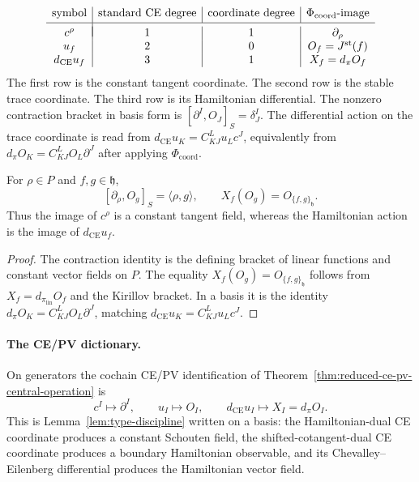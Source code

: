 \documentclass[11pt]{memoir}
\begin{document}
\begin{rmk}\label{rmk:type-discipline-table}
  \[
    \begin{array}{c|c|c|c}
      \text{symbol} & \text{standard CE degree}
        & \text{coordinate degree} & \Phi_{\mathrm{coord}}\text{-image}
        \\[2pt]
      \hline\\[-9pt]
      c^\rho & 1 & 1
        & \partial_\rho
        \\
      u_f & 2 & 0
        & O_f=J^{\mathrm{st}}(f)
        \\
      d_{\mathrm{CE}}u_f & 3 & 1
        & X_f=d_\pi O_f
    \end{array}
  \]
  The first row is the constant tangent coordinate.  The second row is
  the stable trace coordinate.  The third row is its Hamiltonian
  differential.  The
  nonzero contraction bracket in basis form is
  \([\partial^I,O_J]_S=\delta^I_J\).  The differential action on the trace
  coordinate is read from
  \(d_{\mathrm{CE}}u_K=C^L_{KJ}u_Lc^J\), equivalently from
  \(d_\pi O_K=C^L_{KJ}O_L\partial^J\) after applying
  \(\Phi_{\mathrm{coord}}\).
\end{rmk}

\begin{lem}\label{lem:bracket-on-observables}
  For \(\rho\in P\) and \(f,g\in\mathfrak h\),
  \[
    [\partial_\rho,O_g]_S=\langle\rho,g\rangle,
    \qquad
    X_f(O_g)=O_{\{f,g\}_{\mathfrak h}}.
  \]
  Thus the image of \(c^\rho\) is a constant tangent field, whereas the
  Hamiltonian action is the image of \(d_{\mathrm{CE}}u_f\).
\end{lem}

\begin{proof}
  The contraction identity is the defining bracket of linear functions
  and constant vector fields on \(P\).  The equality
  \(X_f(O_g)=O_{\{f,g\}_{\mathfrak h}}\) follows from
  \(X_f=d_{\pi_{\mathrm{lin}}}O_f\) and the Kirillov bracket.  In a
  basis it is the identity
  \(d_\pi O_K=C^L_{KJ}O_L\partial^J\), matching
  \(d_{\mathrm{CE}}u_K=C^L_{KJ}u_Lc^J\).
\end{proof}

\paragraph{The CE/PV dictionary.}
On generators the cochain CE/PV identification of
Theorem~\ref{thm:reduced-ce-pv-central-operation} is
\[
  c^I\longmapsto\partial^I,\qquad u_I\longmapsto O_I,
  \qquad d_{\mathrm{CE}}u_I\longmapsto X_I=d_\pi O_I.
\]
This is Lemma~\ref{lem:type-discipline} written on a basis: the
Hamiltonian-dual CE coordinate produces a constant Schouten field, the
shifted-cotangent-dual CE coordinate produces a boundary Hamiltonian
observable, and its Chevalley--Eilenberg differential produces the
Hamiltonian vector field.
\end{document}
